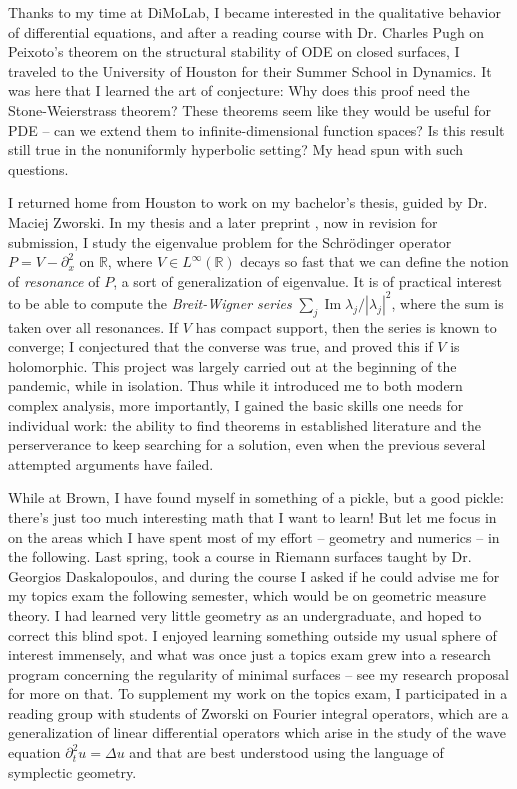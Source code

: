 \documentclass[11pt]{article}
\begin{document}
Thanks to my time at DiMoLab, I became interested in the qualitative behavior of differential equations, and after a reading course with Dr. Charles Pugh on Peixoto's theorem on the structural stability of ODE on closed surfaces, I traveled to the University of Houston for their Summer School in Dynamics.
It was here that I learned the art of conjecture:
Why does this proof need the Stone-Weierstrass theorem?
These theorems seem like they would be useful for PDE -- can we extend them to infinite-dimensional function spaces?
Is this result still true in the nonuniformly hyperbolic setting?
My head spun with such questions.

I returned home from Houston to work on my bachelor's thesis, guided by Dr. Maciej Zworski.
In my thesis and a later preprint \cite{backus2020arxiv}, now in revision for submission, I study the eigenvalue problem for the Schr\"odinger operator $P = V - \partial_x^2$ on $\mathbb R$, where $V \in L^\infty(\mathbb R)$ decays so fast that we can define the notion of \emph{resonance} of $P$, a sort of generalization of eigenvalue.
It is of practical interest to be able to compute the \emph{Breit-Wigner series} $\sum_j \operatorname{Im} \lambda_j/|\lambda_j|^2$, where the sum is taken over all resonances.
If $V$ has compact support, then the series is known to converge; I conjectured that the converse was true, and proved this if $V$ is holomorphic.
This project was largely carried out at the beginning of the pandemic, while in isolation.
Thus while it introduced me to both modern complex analysis, more importantly, I gained the basic skills one needs for individual work: the ability to find theorems in established literature and the perserverance to keep searching for a solution, even when the previous several attempted arguments have failed.

While at Brown, I have found myself in something of a pickle, but a good pickle: there's just too much interesting math that I want to learn! But let me focus in on the areas which I have spent most of my effort -- geometry and numerics -- in the following.
Last spring, took a course in Riemann surfaces taught by Dr. Georgios Daskalopoulos, and during the course I asked if he could advise me for my topics exam the following semester, which would be on geometric measure theory.
I had learned very little geometry as an undergraduate, and hoped to correct this blind spot.
I enjoyed learning something outside my usual sphere of interest immensely, and what was once just a topics exam grew into a research program concerning the regularity of minimal surfaces -- see my research proposal for more on that.
To supplement my work on the topics exam, I participated in a reading group with students of Zworski on Fourier integral operators, which are a generalization of linear differential operators which arise in the study of the wave equation $\partial_t^2 u = \Delta u$ and that are best understood using the language of symplectic geometry.
\end{document}
